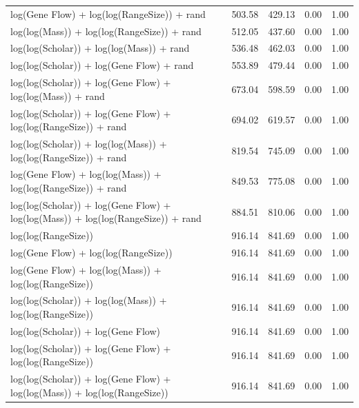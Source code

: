 \begin{table}[ht]
\begin{tabular}{@{}lrrrr@{}}
  log(Gene Flow) + log(log(RangeSize)) + rand & 503.58 & 429.13 & 0.00 & 1.00 \\ 
  log(log(Mass)) + log(log(RangeSize)) + rand & 512.05 & 437.60 & 0.00 & 1.00 \\ 
  log(log(Scholar)) + log(log(Mass)) + rand & 536.48 & 462.03 & 0.00 & 1.00 \\ 
  log(log(Scholar)) + log(Gene Flow) + rand & 553.89 & 479.44 & 0.00 & 1.00 \\ 
  log(log(Scholar)) + log(Gene Flow) + log(log(Mass)) + rand & 673.04 & 598.59 & 0.00 & 1.00 \\ 
  log(log(Scholar)) + log(Gene Flow) + log(log(RangeSize)) + rand & 694.02 & 619.57 & 0.00 & 1.00 \\ 
  log(log(Scholar)) + log(log(Mass)) + log(log(RangeSize)) + rand & 819.54 & 745.09 & 0.00 & 1.00 \\ 
  log(Gene Flow) + log(log(Mass)) + log(log(RangeSize)) + rand & 849.53 & 775.08 & 0.00 & 1.00 \\ 
  log(log(Scholar)) + log(Gene Flow) + log(log(Mass)) + log(log(RangeSize)) + rand & 884.51 & 810.06 & 0.00 & 1.00 \\ 
  log(log(RangeSize)) & 916.14 & 841.69 & 0.00 & 1.00 \\ 
  log(Gene Flow) + log(log(RangeSize)) & 916.14 & 841.69 & 0.00 & 1.00 \\ 
  log(Gene Flow) + log(log(Mass)) + log(log(RangeSize)) & 916.14 & 841.69 & 0.00 & 1.00 \\ 
  log(log(Scholar)) + log(log(Mass)) + log(log(RangeSize)) & 916.14 & 841.69 & 0.00 & 1.00 \\ 
  log(log(Scholar)) + log(Gene Flow) & 916.14 & 841.69 & 0.00 & 1.00 \\ 
  log(log(Scholar)) + log(Gene Flow) + log(log(RangeSize)) & 916.14 & 841.69 & 0.00 & 1.00 \\ 
  log(log(Scholar)) + log(Gene Flow) + log(log(Mass)) + log(log(RangeSize)) & 916.14 & 841.69 & 0.00 & 1.00 \\ 
   \bottomrule
\end{tabular}
\endgroup
\end{table}









